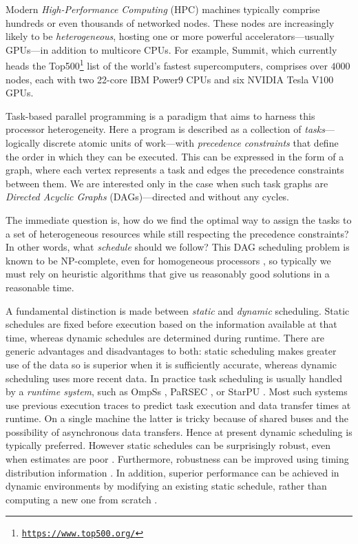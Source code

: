 \documentclass[runningheads]{llncs}
\begin{document}
Modern {\em High-Performance Computing} (HPC) machines typically comprise hundreds or even thousands of networked nodes. These nodes are increasingly likely to be {\em heterogeneous}, hosting one or more powerful accelerators---usually GPUs---in addition to multicore CPUs. For example, Summit, which currently heads the Top500\footnote{\href{https://www.top500.org/}{{\tt \small https://www.top500.org/}}} list of the world's fastest supercomputers, comprises over $4000$ nodes, each with two 22-core IBM Power9 CPUs and six NVIDIA Tesla V100 GPUs. 

Task-based parallel programming is a paradigm that aims to harness this processor heterogeneity. Here a program is described as a collection of {\em tasks}---logically discrete atomic units of work---with {\em precedence constraints} that define the order in which they can be executed. This can be expressed in the form of a graph, where each vertex represents a task and edges the precedence constraints between them. We are interested only in the case when such task graphs are {\em Directed Acyclic Graphs} (DAGs)---directed and without any cycles.  

The immediate question is, how do we find the optimal way to assign the tasks to a set of heterogeneous resources while still respecting the precedence constraints? In other words, what {\em schedule} should we follow? This DAG scheduling problem is known to be NP-complete, even for homogeneous processors \cite{topcuoglu2002performance}, so typically we must rely on heuristic algorithms that give us reasonably good solutions in a reasonable time.

A fundamental distinction is made between {\em static} and {\em dynamic} scheduling. Static schedules are fixed before execution based on the information available at that time, whereas dynamic schedules are determined during runtime. There are generic advantages and disadvantages to both: static scheduling makes greater use of the data so is superior when it is sufficiently accurate, whereas dynamic scheduling uses more recent data. In practice task scheduling is usually handled by a {\em runtime system}, such as OmpSs \cite{duran2011ompss}, PaRSEC \cite{bosilca2013parsec}, or StarPU \cite{augonnet2011starpu}. Most such systems use previous execution traces to predict task execution and data transfer times at runtime. On a single machine the latter is tricky because of shared buses and the possibility of asynchronous data transfers. Hence at present dynamic scheduling is typically preferred. However static schedules can be surprisingly robust, even when estimates are poor \cite{agullo2016}. Furthermore, robustness can be improved using timing distribution information \cite{ZHENG20131673}. In addition, superior performance can be achieved in dynamic environments by modifying an existing static schedule, rather than computing a new one from scratch \cite{agullo2016}. 
\end{document}
